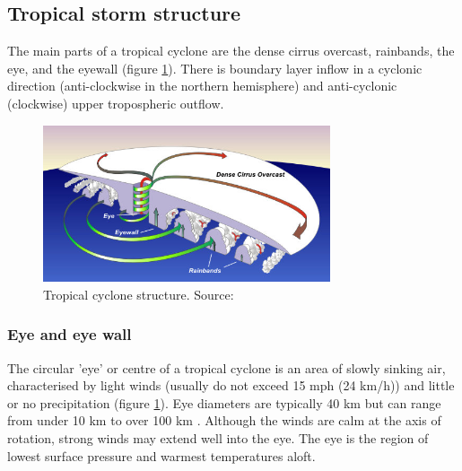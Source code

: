 

\subsection{Tropical storm structure}

The main parts of a tropical cyclone are the dense cirrus overcast, rainbands, the eye, and the eyewall (figure \ref{fig:cyclone_structure}). There is boundary layer inflow in a cyclonic direction (anti-clockwise in the northern hemisphere) and anti-cyclonic (clockwise) upper tropospheric outflow.


\begin{figure}[h]
	\centering
	\noindent\includegraphics[width=20pc,angle=0]{hurr_cross.jpg}
	\caption{Tropical cyclone structure. Source: \cite{noaa_structure}}\label{fig:cyclone_structure}
\end{figure}

\subsubsection{Eye and eye wall}
The circular 'eye' or centre of a tropical cyclone is an area of slowly sinking air, characterised by light winds (usually do not exceed 15 mph (24 km/h)) \citep{noaa_structure} and little or no precipitation (figure \ref{fig:cyclone_structure}). Eye diameters are typically 40 km but can range from under 10 km to over 100 km \citep{bom_tc}. Although the winds are calm at the axis of rotation, strong winds may extend well into the eye. The eye is the region of lowest surface pressure and warmest temperatures aloft.

